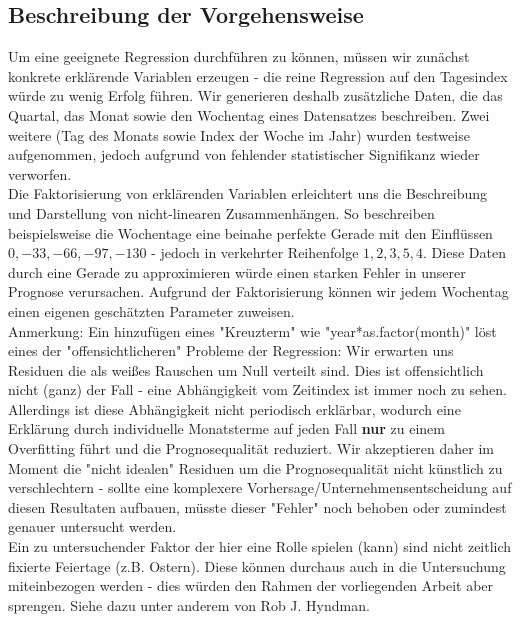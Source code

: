 \documentclass[a4paper,11pt]{article}
\begin{document}
\subsection{Beschreibung der Vorgehensweise}

Um eine geeignete Regression durchführen zu können, müssen wir zunächst konkrete erklärende Variablen erzeugen - die reine Regression auf den Tagesindex würde zu wenig Erfolg führen. Wir generieren deshalb zusätzliche Daten, die das Quartal, das Monat sowie den Wochentag eines Datensatzes beschreiben. Zwei weitere (Tag des Monats sowie Index der Woche im Jahr) wurden testweise aufgenommen, jedoch aufgrund von fehlender statistischer Signifikanz wieder verworfen.\\

Die Faktorisierung von erklärenden Variablen erleichtert uns die Beschreibung und Darstellung von nicht-linearen Zusammenhängen. So beschreiben beispielsweise die Wochentage eine beinahe perfekte Gerade mit den Einflüssen $0, -33, -66, -97, -130$ - jedoch in verkehrter Reihenfolge $1, 2, 3, 5, 4$. Diese Daten durch eine Gerade zu approximieren würde einen starken Fehler in unserer Prognose verursachen. Aufgrund der Faktorisierung können wir jedem Wochentag einen eigenen geschätzten Parameter zuweisen.\\

Anmerkung: Ein hinzufügen eines "Kreuzterm" wie "year*as.factor(month)" löst eines der "offensichtlicheren" Probleme der Regression: Wir erwarten uns Residuen die als weißes Rauschen um Null verteilt sind. Dies ist offensichtlich nicht (ganz) der Fall - eine Abhängigkeit vom Zeitindex ist immer noch zu sehen. Allerdings ist diese Abhängigkeit nicht periodisch erklärbar, wodurch eine Erklärung durch individuelle Monatsterme auf jeden Fall \textbf{nur} zu einem Overfitting führt und die Prognosequalität reduziert. Wir akzeptieren daher im Moment die "nicht idealen" Residuen um die Prognosequalität nicht künstlich zu verschlechtern - sollte eine komplexere Vorhersage/Unternehmensentscheidung auf diesen Resultaten aufbauen, müsste dieser "Fehler" noch behoben oder zumindest genauer untersucht werden.\\

Ein zu untersuchender Faktor der hier eine Rolle spielen (kann) sind nicht zeitlich fixierte Feiertage (z.B. Ostern). Diese können durchaus auch in die Untersuchung miteinbezogen werden - dies würden den Rahmen der vorliegenden Arbeit aber sprengen. Siehe dazu unter anderem \cite{holidays} von Rob J. Hyndman.
\end{document}
